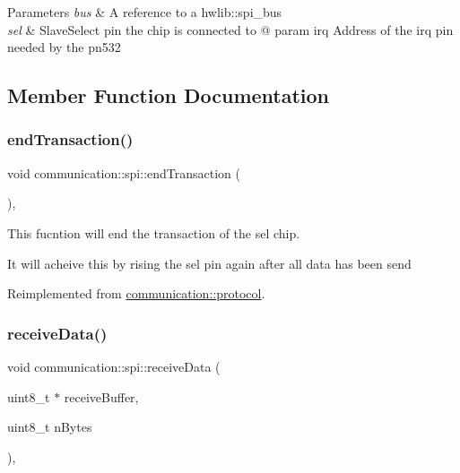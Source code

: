 \begin{DoxyParams}{Parameters}
{\em bus} & A reference to a hwlib\+::spi\+\_\+bus \\
\hline
{\em sel} & Slave\+Select pin the chip is connected to @ param irq Address of the irq pin needed by the pn532 \\
\hline
\end{DoxyParams}


\subsection{Member Function Documentation}
\mbox{\label{classcommunication_1_1spi_a9d10ed759010fef5c687b4f8e63a14f6}} 
\subsubsection{\texorpdfstring{end\+Transaction()}{endTransaction()}}
{\footnotesize\ttfamily void communication\+::spi\+::end\+Transaction (\begin{DoxyParamCaption}{ }\end{DoxyParamCaption})\hspace{0.3cm}{\ttfamily [override]}, {\ttfamily [virtual]}}



This fucntion will end the transaction of the sel chip. 

It will acheive this by rising the sel pin again after all data has been send 

Reimplemented from \hyperlink{classcommunication_1_1protocol_a09be73a92665c2adb539d20b754ce19c}{communication\+::protocol}.

\mbox{\label{classcommunication_1_1spi_a42344d234d3f53829a3edac3949934de}} 
\subsubsection{\texorpdfstring{receive\+Data()}{receiveData()}}
{\footnotesize\ttfamily void communication\+::spi\+::receive\+Data (\begin{DoxyParamCaption}\item[{uint8\+\_\+t $\ast$}]{receive\+Buffer,  }\item[{uint8\+\_\+t}]{n\+Bytes }\end{DoxyParamCaption})\hspace{0.3cm}{\ttfamily [override]}, {\ttfamily [virtual]}}



